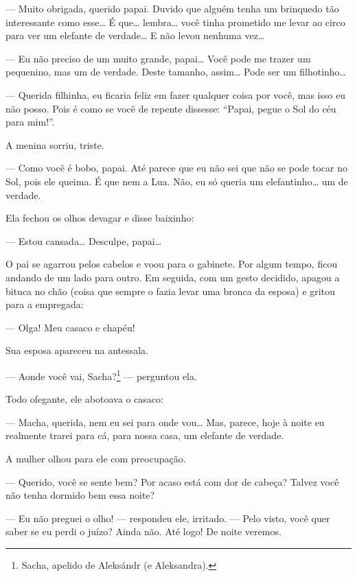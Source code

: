 --- Muito obrigada, querido papai. Duvido que alguém tenha um brinquedo
tão interessante como esse\ldots{} É que\ldots{} lembra\ldots{} você tinha prometido me
levar ao circo para ver um elefante de verdade\ldots{} E não levou nenhuma
vez\ldots{}


--- Eu não preciso de um muito grande, papai\ldots{} Você pode me trazer um
pequenino, mas um de verdade. Deste tamanho, assim\ldots{} Pode ser um
filhotinho\ldots{}

--- Querida filhinha, eu ficaria feliz em fazer qualquer coisa por
você, mas isso eu não posso. Pois é como se você de repente dissesse:
``Papai, pegue o Sol do céu para mim!''.

A menina sorriu, triste.

--- Como você é bobo, papai. Até parece que eu não sei que não se pode
tocar no Sol, pois ele queima. É que nem a Lua. Não, eu só queria um
elefantinho\ldots{} um de verdade.

Ela fechou os olhos devagar e disse baixinho:

--- Estou cansada\ldots{} Desculpe, papai\ldots{}

O pai se agarrou pelos cabelos e voou para o gabinete. Por algum
tempo, ficou andando de um lado para outro. Em seguida, com um gesto
decidido, apagou a bituca no chão (coisa que sempre o fazia levar uma
bronca da esposa) e gritou para a empregada:

--- Olga! Meu casaco e chapéu!

Sua esposa apareceu na antessala.

--- Aonde você vai, Sacha?\footnote{Sacha, apelido de Aleksándr (e
  Aleksandra).} --- perguntou ela.

Todo ofegante, ele abotoava o casaco:

--- Macha, querida, nem eu sei para onde vou\ldots{} Mas, parece, hoje à
noite eu realmente trarei para cá, para nossa casa, um elefante de
verdade.

A mulher olhou para ele com preocupação.

--- Querido, você se sente bem? Por acaso está com dor de cabeça? Talvez
você não tenha dormido bem essa noite?

--- Eu não preguei o olho! --- respondeu ele, irritado. --- Pelo visto,
você quer saber se eu perdi o juízo? Ainda não. Até logo! De noite
veremos.

